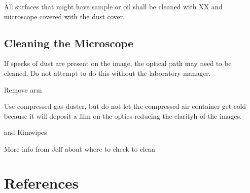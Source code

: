 \documentclass[12pt]{../SOP3_beta}
\begin{document}
\NP All surfaces that might have sample or oil shall be cleaned with XX and microscope covered with the dust cover. 

\subsection*{Cleaning the Microscope}

\NP If specks of dust are present on the image, the optical path may need to be cleaned. Do not attempt to do this without the laboratory manager.

\NP Remove arm

\NP Use compressed gas duster, but do not let the compressed air container get cold because it will deposit a film on the optics reducing the clarityh of the images.

\NP and Kimwipes

\NP More info from Jeff about where to check to clean

\section{References}
\end{document}
